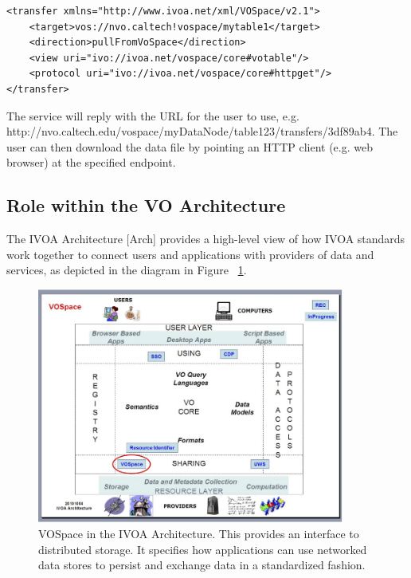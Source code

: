 \documentclass[11pt,a4paper]{ivoa}
\begin{document}
\begin{lstlisting}
<transfer xmlns="http://www.ivoa.net/xml/VOSpace/v2.1">
    <target>vos://nvo.caltech!vospace/mytable1</target>
    <direction>pullFromVoSpace</direction> 
    <view uri="ivo://ivoa.net/vospace/core#votable"/> 
    <protocol uri="ivo://ivoa.net/vospace/core#httpget"/>  
</transfer>
\end{lstlisting}

The service will reply with the URL for the user to use, e.g. http://nvo.caltech.edu/vospace/myDataNode/table123/transfers/3df89ab4. The user can then download the data file by pointing an HTTP client (e.g. web browser) at the specified endpoint.

\subsection{Role within the VO Architecture}

The IVOA Architecture [Arch] provides a high-level view of how IVOA standards work together to connect users and applications with providers of data and services, as depicted in the diagram in Figure ~\ref{fig:archdiag}.

\begin{figure}
\centering


\includegraphics[width=0.9\textwidth]{archdiag.png}
\caption{VOSpace in the IVOA Architecture. This provides an interface to distributed storage. It specifies how applications can use networked data stores to persist and exchange data in a standardized fashion.}
\label{fig:archdiag}
\end{figure}
\end{document}

